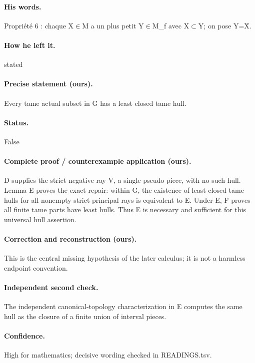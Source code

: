 \paragraph{His words.} Propriété 6 : chaque X\ensuremath{\in}M a un plus petit Y\ensuremath{\in}M\_f avec X\ensuremath{\subset}Y; on pose Y=X̄.

\paragraph{How he left it.} stated

\paragraph{Precise statement (ours).} Every tame actual subset in G has a least closed tame hull.

\paragraph{Status.} False

\paragraph{Complete proof / counterexample application (ours).} D supplies the strict negative ray V, a single pseudo-piece, with no such hull. Lemma E proves the exact repair: within G, the existence of least closed tame hulls for all nonempty strict principal rays is equivalent to E. Under E, F proves all finite tame parts have least hulls. Thus E is necessary and sufficient for this universal hull assertion.

\paragraph{Correction and reconstruction (ours).} This is the central missing hypothesis of the later calculus; it is not a harmless endpoint convention.

\paragraph{Independent second check.} The independent canonical-topology characterization in E computes the same hull as the closure of a finite union of interval pieces.

\paragraph{Confidence.} High for mathematics; decisive wording checked in READINGS.tsv.


